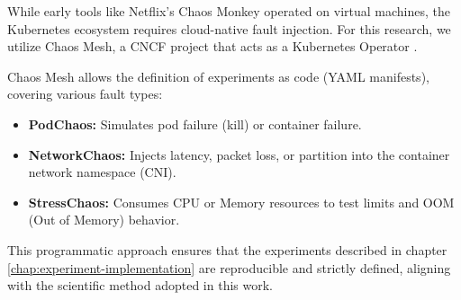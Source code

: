 While early tools like Netflix's Chaos Monkey operated on virtual machines, the Kubernetes ecosystem requires cloud-native fault injection. For this research, we utilize Chaos Mesh, a CNCF project that acts as a Kubernetes Operator \cite{chaos_mesh_2025}.

Chaos Mesh allows the definition of experiments as code (YAML manifests), covering various fault types:
\begin{itemize}
    \item \textbf{PodChaos:} Simulates pod failure (kill) or container failure.
    \item \textbf{NetworkChaos:} Injects latency, packet loss, or partition into the container network namespace (CNI).
    \item \textbf{StressChaos:} Consumes CPU or Memory resources to test limits and OOM (Out of Memory) behavior.
\end{itemize}

This programmatic approach ensures that the experiments described in chapter \ref{chap:experiment-implementation} are reproducible and strictly defined, aligning with the scientific method adopted in this work.